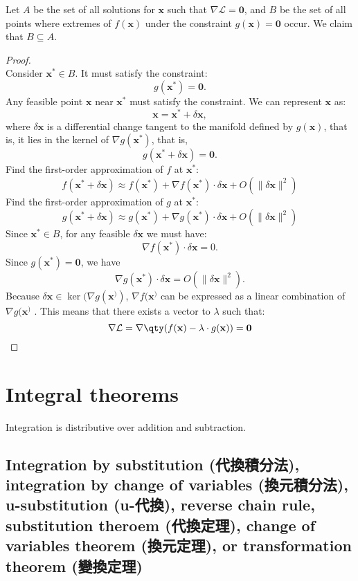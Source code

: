 \documentclass[a4paper,12pt]{report}
\begin{document}
 Let $A$ be the set of all solutions for \( \mathbf{x} \) such that $\nabla \mathcal{L} = \mathbf{0}$, and $B$ be the set of all points where extremes of \( f(\mathbf{x}) \) under the constraint \( g(\mathbf{x}) = \mathbf{0}\) occur. We claim that $B\subseteq A$.
\begin{proof}\mbox{}\\
Consider $\mathbf{x}^*\in B$. It must satisfy the constraint:
\[g(\mathbf{x}^*) = \mathbf{0}.\]
Any feasible point $\mathbf{x}$ near $\mathbf{x}^*$ must satisfy the constraint. We can represent $\mathbf{x}$ as:
\[\mathbf{x} = \mathbf{x}^* + \delta\mathbf{x},\]
where $\delta\mathbf{x}$ is a differential change tangent to the manifold defined by $g(\mathbf{x})$, that is, it lies in the kernel of $\nabla g(\mathbf{x}^*)$, that is,
\[g(\mathbf{x}^* + \delta\mathbf{x}) = \mathbf{0}.\]
Find the first-order approximation of $f$ at $\mathbf{x}^*$:
\[f(\mathbf{x}^*+ \delta\mathbf{x}) \approx f(\mathbf{x}^*) + \nabla f(\mathbf{x}^*) \cdot \delta\mathbf{x} + O(\|\delta\mathbf{x}\|^2)\]
Find the first-order approximation of $g$ at $\mathbf{x}^*$:
\[g(\mathbf{x}^*+ \delta\mathbf{x}) \approx g(\mathbf{x}^*) + \nabla g(\mathbf{x}^*) \cdot \delta\mathbf{x} + O(\|\delta\mathbf{x}\|^2)\]
Since $\mathbf{x}^*\in B$, for any feasible $\delta\mathbf{x}$ we must have:
\[\nabla f(\mathbf{x}^*) \cdot \delta\mathbf{x} = 0.\]
Since $g(\mathbf{x}^*) = \mathbf{0}$, we have
\[\nabla g(\mathbf{x}^*) \cdot \delta\mathbf{x} = O(\|\delta\mathbf{x}\|^2).\]
Because \( \delta\mathbf{x} \in \ker(\nabla g(\mathbf{x}^)) \), \( \nabla f(\mathbf{x}^) \) can be expressed as a linear combination of \( \nabla g(\mathbf{x}^) \) . This means that there exists a vector to $\lambda$ such that:
\[\nabla\mathcal{L} = \nabla \qty(f(\mathbf{x}) - \lambda \cdot g(\mathbf{x})) = \mathbf{0} \]
\end{proof}



\section{Integral theorems}
Integration is distributive over addition and subtraction.
\subsection{Integration by substitution (代換積分法), integration by change of variables (換元積分法), u-substitution (u-代換), reverse chain rule, substitution theroem (代換定理), change of variables theorem (換元定理), or transformation theorem (變換定理)}
\end{document}

